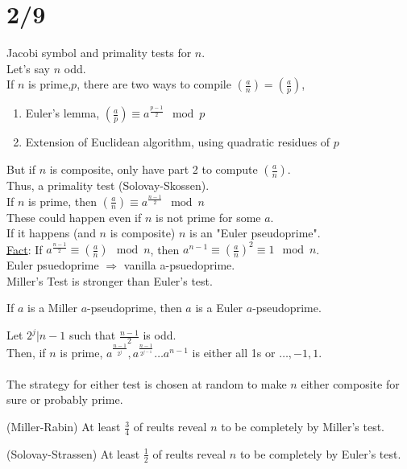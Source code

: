 \section*{2/9}
  Jacobi symbol and primality tests for $n$.\\
  Let's say $n$ odd.\\
  If $n$ is prime,$p$, there are two ways to compile $(\frac{a}{n}) = (
  \frac{a}{p})$,
  \begin{enumerate}
    \item Euler's lemma, $(\frac{a}{p}) \equiv a^{\frac{p-1}{2}} \mod p$
    \item Extension of Euclidean algorithm, using quadratic residues of $p$
  \end{enumerate}
   But if $n$ is composite, only have part 2 to compute $(\frac{a}{n})$.\\
   Thus, a primality test (Solovay-Skossen).\\
   If $n$ is prime, then $(\frac{a}{n}) \equiv a^{\frac{n-1}{2}} \mod n$\\
   These could happen even if $n$ is not prime for some $a$.\\
   If it happens (and $n$ is composite) $n$ is an "Euler pseudoprime".\\
   \underline{Fact}: If $a^{\frac{n-1}{2}} \equiv (\frac{a}{n}) \mod n$, then
   $a^{n-1} \equiv (\frac{a}{n})^2 \equiv 1 \mod n$.\\
   Euler psuedoprime $\Rightarrow$ vanilla a-psuedoprime.\\
   Miller's Test is stronger than Euler's test.\\
   \begin{theorem}
    If $a$ is a Miller $a$-pseudoprime, then $a$ is a Euler $a$-pseudoprime.
   \end{theorem}
   Let $2^j | n - 1$ such that $\frac{n-1}{2}$ is odd.\\
   Then, if $n$ is prime, $a^{\frac{n-1}{2^j}}, a^{\frac{n-1}{2^{j-1}}} \ldots
   a^{n-1}$ is either all 1s or $\ldots, -1, 1$.\\\\
   The strategy for either test is chosen at random to make $n$ either composite
   for sure or probably prime.\\
   \begin{theorem}(Miller-Rabin)
    At least $\frac{3}{4}$ of reults reveal $n$ to be completely by Miller's 
    test. 
   \end{theorem}
   \begin{theorem}(Solovay-Strassen)
    At least $\frac{1}{2}$ of reults reveal $n$ to be completely by Euler's 
    test. 
   \end{theorem}
